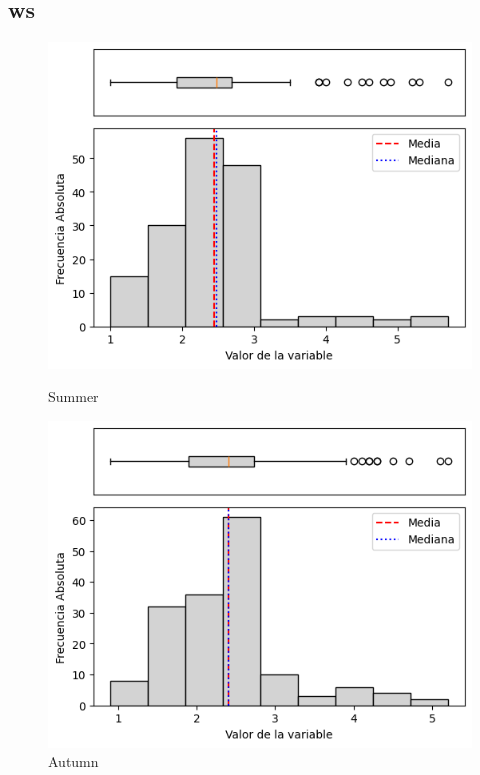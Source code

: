 \subsection{\gls{ws} }

\begin{figure}[htbp]
\centering
\begin{minipage}{0.30\textwidth}
  \includegraphics[width=\linewidth]{resultados/por_estacion_del_anio/boxplot_clases_por_estacion/Andahuaylas/WS_HistBoxplot_Summer.png}
  \caption*{Summer}
\end{minipage}
\hfill
\begin{minipage}{0.30\textwidth}
  \includegraphics[width=\linewidth]{resultados/por_estacion_del_anio/boxplot_clases_por_estacion/Andahuaylas/WS_HistBoxplot_Autumn.png}
  \caption*{Autumn}
\end{minipage}


\end{figure}
